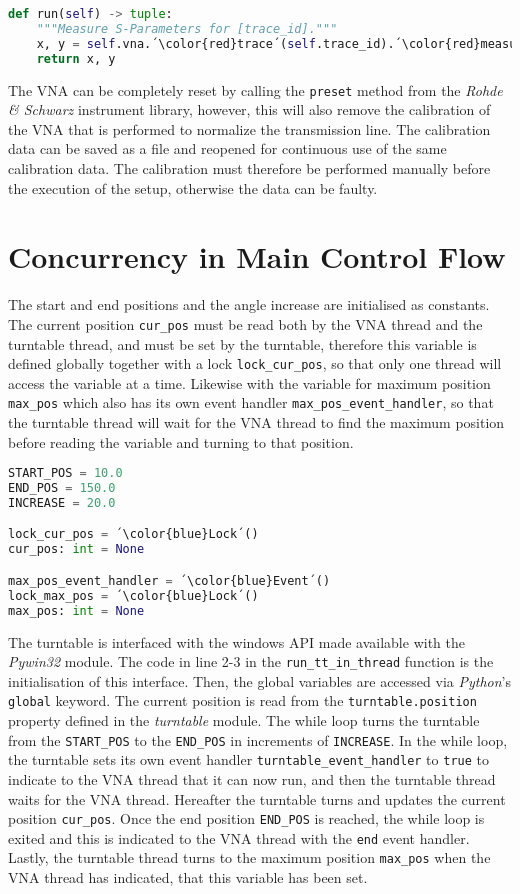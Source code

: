 \begin{lstlisting}[language=Python, caption=Method for getting measurements from VNA.]
def run(self) -> tuple:
    """Measure S-Parameters for [trace_id]."""
    x, y = self.vna.´\color{red}trace´(self.trace_id).´\color{red}measure\_formatted\_data´()
    return x, y
\end{lstlisting}

The VNA can be completely reset by calling the \verb+preset+ method from the \textit{Rohde \& Schwarz} instrument library, however, this will also remove the calibration of the VNA that is performed to normalize the transmission line. The calibration data can be saved as a file and reopened for continuous use of the same calibration data. The calibration must therefore be performed manually before the execution of the setup, otherwise the data can be faulty.

\section{Concurrency in Main Control Flow}
The start and end positions and the angle increase are initialised as constants. The current position \verb+cur_pos+ must be read both by the VNA thread and the turntable thread, and must be set by the turntable, therefore this variable is defined globally together with a lock \verb+lock_cur_pos+, so that only one thread will access the variable at a time. Likewise with the variable for maximum position \verb+max_pos+ which also has its own event handler \verb+max_pos_event_handler+, so that the turntable thread will wait for the VNA thread to find the maximum position before reading the variable and turning to that position.
\begin{lstlisting}[language=Python, caption=Global constants and variables.]
START_POS = 10.0
END_POS = 150.0
INCREASE = 20.0

lock_cur_pos = ´\color{blue}Lock´()
cur_pos: int = None

max_pos_event_handler = ´\color{blue}Event´()
lock_max_pos = ´\color{blue}Lock´()
max_pos: int = None
\end{lstlisting}

The turntable is interfaced with the windows API made available with the \textit{Pywin32} module. The code in line 2-3 in the \verb+run_tt_in_thread+ function is the initialisation of this interface. Then, the global variables are accessed via \textit{Python}'s \verb+global+ keyword. The current position is read from the \verb+turntable.position+ property defined in the \textit{turntable} module. The while loop turns the turntable from the \verb+START_POS+ to the \verb+END_POS+ in increments of \verb+INCREASE+. In the while loop, the turntable sets its own event handler \verb+turntable_event_handler+ to \verb+true+ to indicate to the VNA thread that it can now run, and then the turntable thread waits for the VNA thread. Hereafter the turntable turns and updates the current position \verb+cur_pos+. Once the end position \verb+END_POS+ is reached, the while loop is exited and this is indicated to the VNA thread with the \verb+end+ event handler. Lastly, the turntable thread turns to the maximum position \verb+max_pos+ when the VNA thread has indicated, that this variable has been set. 

